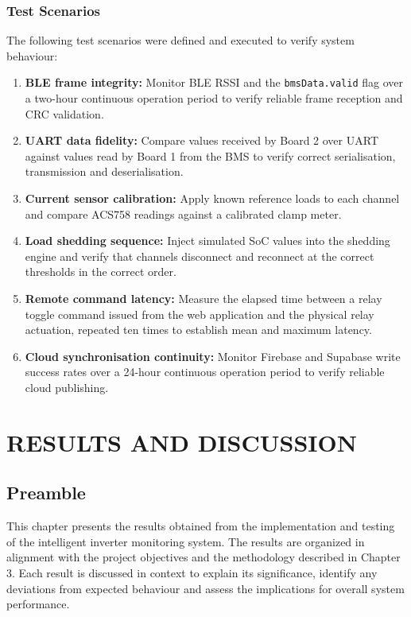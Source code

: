 \documentclass[12pt, a4paper]{report}
\begin{document}
{\subsection{Test Scenarios}

The following test scenarios were defined and executed to verify system
behaviour:

\begin{enumerate}[noitemsep, leftmargin=0.7in]
  \item \textbf{BLE frame integrity:} Monitor BLE RSSI and the
        \texttt{bmsData.valid} flag over a two-hour continuous operation
        period to verify reliable frame reception and CRC validation.
  \item \textbf{UART data fidelity:} Compare values received by Board 2
        over UART against values read by Board 1 from the BMS to verify
        correct serialisation, transmission and deserialisation.
  \item \textbf{Current sensor calibration:} Apply known reference loads to
        each channel and compare ACS758 readings against a calibrated clamp
        meter.
  \item \textbf{Load shedding sequence:} Inject simulated SoC values into
        the shedding engine and verify that channels disconnect and reconnect
        at the correct thresholds in the correct order.
  \item \textbf{Remote command latency:} Measure the elapsed time between a
        relay toggle command issued from the web application and the physical
        relay actuation, repeated ten times to establish mean and maximum
        latency.
  \item \textbf{Cloud synchronisation continuity:} Monitor Firebase and
        Supabase write success rates over a 24-hour continuous operation
        period to verify reliable cloud publishing.
\end{enumerate}


\chapter{RESULTS AND DISCUSSION}

\section{Preamble}

This chapter presents the results obtained from the implementation and
testing of the intelligent inverter monitoring system. The results are
organized in alignment with the project objectives and the methodology
described in Chapter 3. Each result is discussed in context to explain
its significance, identify any deviations from expected behaviour and
assess the implications for overall system performance.

}
\end{document}
